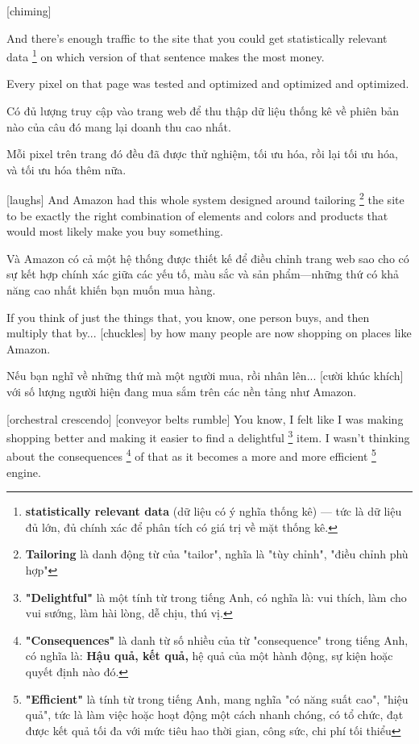 \documentclass[a4paper]{article}
\begin{document}
	[chiming]
	
	And there's enough traffic to the site that you could get statistically relevant data \footnote{
		\textbf{statistically relevant data} (dữ liệu có ý nghĩa thống kê) — tức là dữ liệu đủ lớn, đủ chính xác để phân tích có giá trị về mặt thống kê.
	
	} on which version of that sentence makes the most money.
	
	Every pixel on that page was tested and optimized and optimized and optimized.
	
	\begin{vietnamese-v2}
		Có đủ lượng truy cập vào trang web để thu thập dữ liệu thống kê về phiên bản nào của câu đó mang lại doanh thu cao nhất. 
		
		Mỗi pixel trên trang đó đều đã được thử nghiệm, tối ưu hóa, rồi lại tối ưu hóa, và tối ưu hóa thêm nữa.
	\end{vietnamese-v2}
	
	[laughs] And Amazon had this whole system designed around tailoring \footnote{
		\textbf{Tailoring} là danh động từ của "tailor", nghĩa là "tùy chỉnh", "điều chỉnh phù hợp"
	
	} the site to be exactly the right combination of elements and colors and products that would most likely make you buy something.
	
	\begin{vietnamese-v2}
		[cười] Và Amazon có cả một hệ thống được thiết kế để điều chỉnh trang web sao cho có sự kết hợp chính xác giữa các yếu tố, màu sắc và sản phẩm—những thứ có khả năng cao nhất khiến bạn muốn mua hàng.
	\end{vietnamese-v2}
	
	
	If you think of just the things that, you know, one person buys, and then multiply that by... [chuckles] by how many people are now shopping on places like Amazon.
	
	\begin{vietnamese-v2}
		Nếu bạn nghĩ về những thứ mà một người mua, rồi nhân lên... [cười khúc khích] với số lượng người hiện đang mua sắm trên các nền tảng như Amazon.
	\end{vietnamese-v2}
	
	[orchestral crescendo]
	[conveyor belts rumble]
	You know, I felt like I was making shopping better and making it easier to find a delightful \footnote{
		\textbf{"Delightful"} là một tính từ trong tiếng Anh, có nghĩa là: vui thích, làm cho vui sướng, làm hài lòng, dễ chịu, thú vị.
	
	} item.
	I wasn't thinking about the consequences \footnote{
		\textbf{"Consequences"} là danh từ số nhiều của từ "consequence" trong tiếng Anh, có nghĩa là: \textbf{Hậu quả, kết quả,} hệ quả của một hành động, sự kiện hoặc quyết định nào đó.
	
	} of that as it becomes a more and more efficient \footnote{
		\textbf{"Efficient"} là tính từ trong tiếng Anh, mang nghĩa "có năng suất cao", "hiệu quả", tức là làm việc hoặc hoạt động một cách nhanh chóng, có tổ chức, đạt được kết quả tối đa với mức tiêu hao thời gian, công sức, chi phí tối thiểu
	
	} engine.
	
\end{document}
